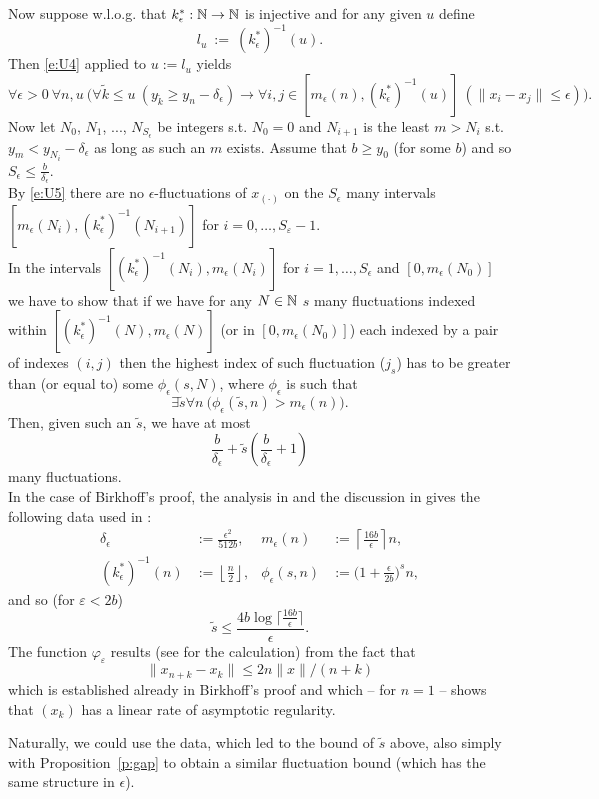 Now suppose w.l.o.g. that $k^*_\epsilon:\mathbb{N}\to\mathbb{N}$ is injective and for any given $u$ define
\[
l_u\ :=\ (k^*_\epsilon)^{-1}(u).
\]
Then \eqref{e:U4} applied to $u:=l_u$ yields
\[
\forall \epsilon>0\ \forall n,u\ \Big( \forall \tilde k\le u\ 
(y_{\tilde k}\geq y_n-\delta_\epsilon)\rightarrow 
 \forall i,j\in[m_\epsilon(n),(k^*_\epsilon)^{-1}(u)]\ 
(\|x_i-x_j\|\leq \epsilon) \Big).
\tag{-}\label{e:U5}\]
Now let $N_0$, $N_1$, ..., $N_{S_\epsilon}$ be integers s.t. $N_0=0$ and $N_{i+1}$ is the least $m>N_i$ s.t. $y_m<y_{N_i}-\delta_\epsilon$ as long as such an $m$ exists.
Assume that $b\geq y_0$ (for some $b$) and so $S_\epsilon\leq\frac{b}{\delta_\epsilon}$.\\
By \eqref{e:U5} there are no $\epsilon$-fluctuations of $x_{(\cdot)}$ on the 
$S_\epsilon$ many intervals $[m_\epsilon(N_i),(k^*_\epsilon)^{-1}
(N_{i+1})]$ for $i=0,\ldots,S_{\varepsilon}-1$.\\
In the intervals $[(k^*_\epsilon)^{-1}(N_{i}),m_\epsilon(N_i)]$ 
for $i=1,\ldots,
S_\epsilon$ and $[0,m_\epsilon(N_0)]$ we have to show that if we have for 
any $N\in\mathbb{N}$ $s$ many
fluctuations indexed within $[(k^*_\epsilon)^{-1}(N),m_\epsilon(N)]$ 
(or in $[0,m_\epsilon(N_0)]$) each indexed by a pair of indexes $(i,j)$ 
then the highest index of such fluctuation ($j_s$) has to be greater than 
(or equal to) some $\phi_\epsilon(s,N)$, where $\phi_\epsilon$ is such that
\[
\exists \tilde s\forall n\ \big(\phi_\epsilon(\tilde s,n)>m_\epsilon(n)\big).
\]
Then, given such an $\tilde s$, we have at most
\[
\frac{b}{\delta_\epsilon}+\tilde s\left(\frac{b}{\delta_\epsilon}+1\right)
\]
many fluctuations.
\\[2mm]
In the case of Birkhoff's proof, the analysis in \cite{kohlenbachleustean09} 
and the discussion in \cite{Avigad/Rute} 
gives the following data used in \cite{Avigad/Rute}: 
\begin{align*}
\delta_\epsilon &:= \frac{\epsilon^2}{512b},& m_\epsilon(n)&:=\left\lceil 
\frac{16b}{\epsilon}\right\rceil n,\\
(k^*_\epsilon)^{-1}(n)&:=\left\lfloor\frac{n}{2}\right\rfloor,& 
\phi_\epsilon(s,n)&:=\big(1+ \frac{\epsilon}{2b}\big)^s n,
\end{align*}
and so (for $\varepsilon <2b$) \[ \tilde s \leq \frac{ 4 b\log \big\lceil 
\frac{16b}{\epsilon}\big\rceil }{\epsilon}.\]
The function $\varphi_{\varepsilon}$ results (see \cite{Avigad/Rute} for 
the calculation) from the fact that 
\[ \| x_ {n+k}-x_k\|\le 2n\| x\|/(n+k) \]
which is established already in Birkhoff's proof and which -- for $n=1$ -- 
shows that $(x_k)$ has a linear rate of asymptotic regularity.
\begin{rmk}
Naturally, we could use the data, which led to the bound 
of $\tilde s$ above, also simply with Proposition~\ref{p:gap} to
obtain a similar fluctuation bound (which has the same structure in $\epsilon$).
\end{rmk}

